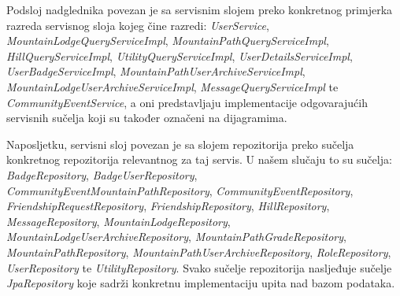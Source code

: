 			Podsloj nadglednika povezan je sa servisnim slojem preko konkretnog primjerka razreda servisnog sloja kojeg čine razredi: \textit{UserService}, \textit{MountainLodgeQueryServiceImpl}, \textit{MountainPathQueryServiceImpl}, 
			\textit{HillQueryServiceImpl}, \textit{UtilityQueryServiceImpl}, \textit{UserDetailsServiceImpl}, \textit{UserBadgeServiceImpl}, \textit{MountainPathUserArchiveServiceImpl}, \textit{MountainLodgeUserArchiveServiceImpl}, \textit{MessageQueryServiceImpl} te \textit{CommunityEventService},
			 a oni predstavljaju implementacije odgovarajućih servisnih sučelja koji su također označeni na dijagramima.
			
			 Naposljetku, servisni sloj povezan je sa slojem repozitorija preko sučelja konkretnog repozitorija relevantnog za taj servis. U našem slučaju to su sučelja: \textit{BadgeRepository}, \textit{BadgeUserRepository}, \textit{CommunityEventMountainPathRepository}, \textit{CommunityEventRepository}, \textit{FriendshipRequestRepository}, \textit{FriendshipRepository}, \textit{HillRepository}, \textit{MessageRepository}, \textit{MountainLodgeRepository}, \textit{MountainLodgeUserArchiveRepository}, \textit{MountainPathGradeRepository}, \textit{MountainPathRepository}, \textit{MountainPathUserArchiveRepository}, \textit{RoleRepository}, \textit{UserRepository} te
			 \textit{UtilityRepository}. 
			 Svako sučelje repozitorija nasljeđuje sučelje \textit{JpaRepository} koje sadrži konkretnu implementaciju upita nad bazom podataka.
			 
